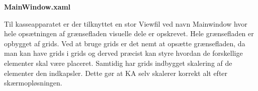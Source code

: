 \textbf{MainWindow.xaml}

Til kasseapparatet er der tilknyttet en stor Viewfil ved navn Mainwindow hvor hele opsætningen af grænsefladen visuelle dele er opskrevet. Hele grænsefladen er opbygget af grids. Ved at bruge grids er det nemt at opsætte grænsefladen, da man kan have grids i grids og derved præcist kan styre hvordan de forskellige elementer skal være placeret. Samtidig har grids indbygget skalering af de elementer den indkapsler. Dette gør at \gls{KA} selv skalerer korrekt alt efter skærmopløsningen.
